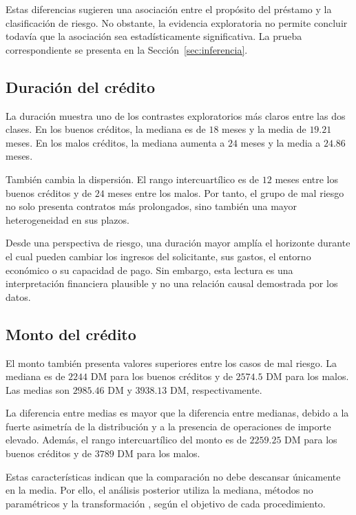Estas diferencias sugieren una asociación entre el propósito del
préstamo y la clasificación de riesgo. No obstante, la evidencia
exploratoria no permite concluir todavía que la asociación sea
estadísticamente significativa. La prueba correspondiente se presenta
en la Sección~\ref{sec:inferencia}.

\subsection{Duración del crédito}

La duración muestra uno de los contrastes exploratorios más claros entre
las dos clases. En los buenos créditos, la mediana es de \(18\) meses y
la media de \(19.21\) meses. En los malos créditos, la mediana aumenta a
\(24\) meses y la media a \(24.86\) meses.

También cambia la dispersión. El rango intercuartílico es de \(12\)
meses entre los buenos créditos y de \(24\) meses entre los malos. Por
tanto, el grupo de mal riesgo no solo presenta contratos más prolongados,
sino también una mayor heterogeneidad en sus plazos.

Desde una perspectiva de riesgo, una duración mayor amplía el horizonte
durante el cual pueden cambiar los ingresos del solicitante, sus gastos,
el entorno económico o su capacidad de pago. Sin embargo, esta lectura
es una interpretación financiera plausible y no una relación causal
demostrada por los datos.

\subsection{Monto del crédito}

El monto también presenta valores superiores entre los casos de mal
riesgo. La mediana es de \(2244\) DM para los buenos créditos y de
\(2574.5\) DM para los malos. Las medias son \(2985.46\) DM y
\(3938.13\) DM, respectivamente.

La diferencia entre medias es mayor que la diferencia entre medianas,
debido a la fuerte asimetría de la distribución y a la presencia de
operaciones de importe elevado. Además, el rango intercuartílico del
monto es de \(2259.25\) DM para los buenos créditos y de \(3789\) DM
para los malos.

Estas características indican que la comparación no debe descansar
únicamente en la media. Por ello, el análisis posterior utiliza la
mediana, métodos no paramétricos y la transformación
, según el objetivo de cada procedimiento.

